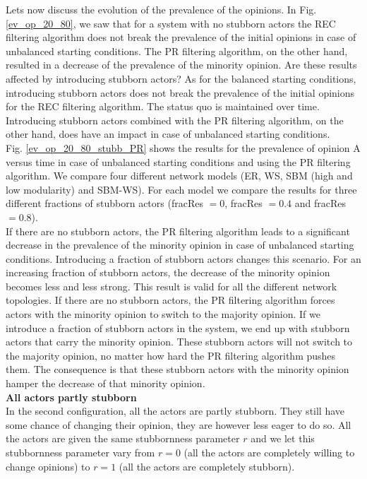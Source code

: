 \documentclass[11 pt , letterpaper , twoside , openright]{book}
\begin{document}
\noindent
Lets now discuss the evolution of the prevalence of the opinions. In Fig. \ref{ev_op_20_80}, we saw that for a system with no stubborn actors the REC filtering algorithm does not break the prevalence of the initial opinions in case of unbalanced starting conditions. The PR filtering algorithm, on the other hand, resulted in a decrease of the prevalence of the minority opinion. Are these results affected by introducing stubborn actors? As for the balanced starting conditions, introducing stubborn actors does not break the prevalence of the initial opinions for the REC filtering algorithm. The status quo is maintained over time. Introducing stubborn actors combined with the PR filtering algorithm, on the other hand, does have an impact in case of unbalanced starting conditions.\\
\newline
Fig. \ref{ev_op_20_80_stubb_PR} shows the results for the prevalence of opinion A versus time in case of unbalanced starting conditions and using the PR filtering algorithm. We compare four different network models (ER, WS, SBM (high and low modularity) and SBM-WS). For each model we compare the results for three different fractions of stubborn actors (fracRes $=0$, fracRes $=0.4$ and fracRes $=0.8$). \\
\newline
If there are no stubborn actors, the PR filtering algorithm leads to a significant decrease in the prevalence of the minority opinion in case of unbalanced starting conditions. Introducing a fraction of stubborn actors changes this scenario. For an increasing fraction of stubborn actors, the decrease of the minority opinion becomes less and less strong. This result is valid for all the different network topologies. If there are no stubborn actors, the PR filtering algorithm forces actors with the minority opinion to switch to the majority opinion. If we introduce a fraction of stubborn actors in the system, we end up with stubborn actors that carry the minority opinion. These stubborn actors will not switch to the majority opinion, no matter how hard the PR filtering algorithm pushes them. The consequence is that these stubborn actors with the minority opinion hamper the decrease of that minority opinion. \\
\newline
\textbf{All actors partly stubborn}\\
\newline
In the second configuration, all the actors are partly stubborn. They still have some chance of changing their opinion, they are however less eager to do so. All the actors are given the same stubbornness parameter $r$ and we let this stubbornness parameter vary from $r = 0$ (all the actors are completely willing to change opinions) to $r=1$ (all the actors are completely stubborn).\\
\end{document}
